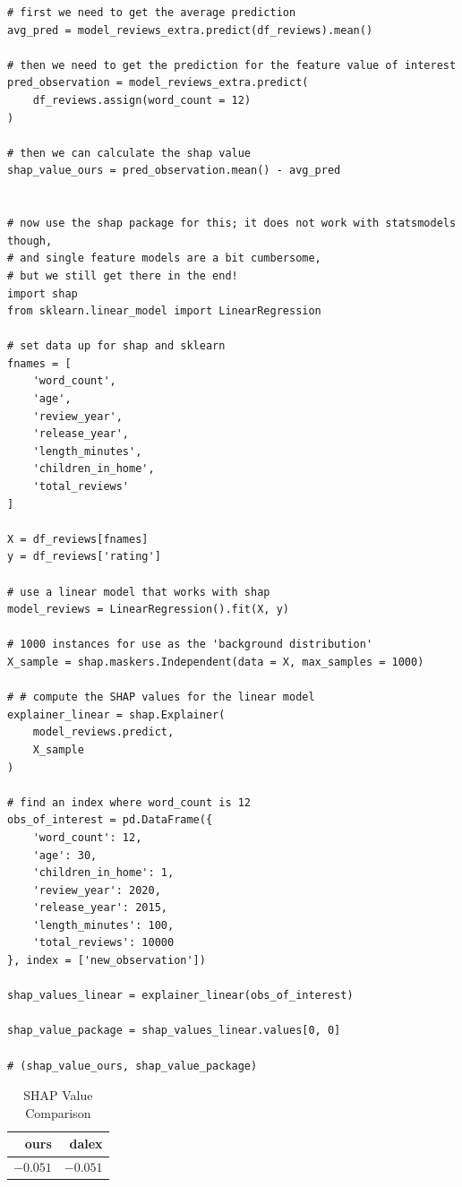 \documentclass[
  letterpaper,
]{krantz}
\begin{document}
\begin{verbatim}
# first we need to get the average prediction
avg_pred = model_reviews_extra.predict(df_reviews).mean()

# then we need to get the prediction for the feature value of interest
pred_observation = model_reviews_extra.predict(
    df_reviews.assign(word_count = 12)
)

# then we can calculate the shap value
shap_value_ours = pred_observation.mean() - avg_pred


# now use the shap package for this; it does not work with statsmodels though,
# and single feature models are a bit cumbersome, 
# but we still get there in the end!
import shap
from sklearn.linear_model import LinearRegression

# set data up for shap and sklearn
fnames = [
    'word_count', 
    'age', 
    'review_year', 
    'release_year', 
    'length_minutes', 
    'children_in_home', 
    'total_reviews'
]

X = df_reviews[fnames]
y = df_reviews['rating']

# use a linear model that works with shap
model_reviews = LinearRegression().fit(X, y)

# 1000 instances for use as the 'background distribution'
X_sample = shap.maskers.Independent(data = X, max_samples = 1000)  

# # compute the SHAP values for the linear model
explainer_linear = shap.Explainer(
    model_reviews.predict, 
    X_sample   
)

# find an index where word_count is 12
obs_of_interest = pd.DataFrame({
    'word_count': 12,
    'age': 30,
    'children_in_home': 1,
    'review_year': 2020,
    'release_year': 2015,
    'length_minutes': 100,
    'total_reviews': 10000
}, index = ['new_observation'])

shap_values_linear = explainer_linear(obs_of_interest)

shap_value_package = shap_values_linear.values[0, 0]

# (shap_value_ours, shap_value_package)
\end{verbatim}

\hypertarget{tbl-shap-values-comparison}{}
\begin{longtable}{rr}
\caption{\label{tbl-shap-values-comparison}SHAP Value Comparison }\tabularnewline

\toprule
ours & dalex \\ 
\midrule\addlinespace[2.5pt]
\textcolor[HTML]{404040}{$-0.051$} & \textcolor[HTML]{404040}{$-0.051$} \\ 
\bottomrule
\end{longtable}
\end{document}
